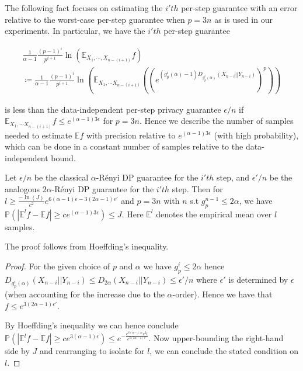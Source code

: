 The following fact focuses on estimating the $i'th$ per-step guarantee with an error relative to the worst-case per-step guarantee when $p = 3n$ as is used in our experiments. In particular, we have the $i'th$ per-step guarantee 

\begin{multline*}
    \frac{1}{\alpha-1} \frac{(p-1)^i}{p^{i+1}} \ln (\mathbb{E}_{X_1, \cdots, X_{n-(i+1)}} f) \\ \coloneqq \frac{1}{\alpha-1} \frac{(p-1)^i}{p^{i+1}} \ln (\mathbb{E}_{X_1,\cdots X_{n-(i+1)}}  ((e^{(g_p^{i}(\alpha) -1)D_{g_p^{i}(\alpha)}(X_{n-i}|| Y_{n-i})})^p))
\end{multline*}

is less than the data-independent per-step privacy guarantee $\epsilon/n$ if $\mathbb{E}_{X_1,\cdots X_{n-(i+1)}} f \leq e^{(\alpha-1) 3 \epsilon}$ for $p = 3n$. Hence we describe the number of samples needed to estimate $\mathbb{E} f$ with precision relative to $e^{(\alpha-1) 3 \epsilon}$ (with high probability), which can be done in a constant number of samples relative to the data-independent bound.

\begin{fact}\label{fact:estimating}
    Let $\epsilon/n$ be the classical $\alpha$-R\'enyi DP guarantee for the $i'th$ step, and $\epsilon'/n$ be the analogous $2\alpha$-R\'enyi DP guarantee for the $i'th$ step. Then for $l \geq \frac{- \ln(J)}{c^2} e^{6(\alpha-1)\epsilon - 3(2\alpha -1) \epsilon'}$ and $p = 3n$ with $n$ s.t $g_p^{n-1} \leq 2\alpha$, we have $\mathbb{P}(|\mathbb{E}^{l} f - \mathbb{E}f| \geq c e^{(\alpha-1) 3 \epsilon}) \leq J$. Here $\mathbb{E}^l$ denotes the empirical mean over $l$ samples.
\end{fact}

The proof follows from Hoeffding's inequality.

\begin{proof}
    

For the given choice of $p$ and $\alpha$ we have $g_{p}^{i} \leq 2\alpha$ hence $D_{g_p^{i}(\alpha)}(X_{n-i} || Y_{n-i}) \leq D_{2 \alpha}(X_{n-i} || Y_{n-i}) \leq \epsilon'/n$ where $\epsilon'$ is determined by $\epsilon$ (when accounting for the increase due to the $\alpha$-order). Hence we have that $f \leq e^{3 (2\alpha -1) \epsilon'}$.

By Hoeffding's inequality we can hence conclude $\mathbb{P}(|\mathbb{E}^l f - \mathbb{E}f| \geq c e^{3(\alpha-1)\epsilon}) \leq e^{-\frac{e^{6(\alpha-1)\epsilon}c^2 l}{e^{3(2\alpha - 1) \epsilon'}}}$. Now upper-bounding the right-hand side by $J$ and rearranging to isolate for $l$, we can conclude the stated condition on $l$.

\end{proof}



